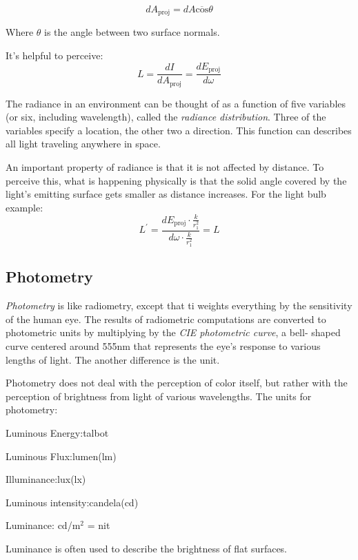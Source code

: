 \documentclass[10pt, a4paper]{article}
\begin{document}
        $$dA_{\text{proj}} = dA\overline{\text{cos}}\theta$$

        Where $\theta$ is the angle between two surface normals. 

        It's helpful to perceive: 
        $$L = \frac{dI}{dA_{\text{proj}}} = \frac{dE_{\text{proj}}}{d\omega}$$

        The radiance in an environment can be thought of as a function of five variables (or six, including wavelength), called the \emph{radiance distribution}. Three of the variables specify a location, the other two a direction. This function can describes all light traveling anywhere in space.

        An important property of radiance is that it is not affected by distance. To perceive this, what is happening physically is that the solid angle covered by the light's emitting surface gets smaller as distance increases. For the light bulb example: 
        $$L^{'} = \frac{dE_{\text{proj}}\cdot\frac{k}{r_1^2}}{d\omega\cdot\frac{k}{r_1^2}} = L$$

    \subsection{Photometry}
        \emph{Photometry} is like radiometry, except that ti weights everything by the sensitivity of the human eye. The results of radiometric computations are converted to photometric units by multiplying by the \emph{CIE photometric curve}, a bell- shaped curve centered around 555nm that represents the eye's response to various lengths of light. The another difference is the unit. 

        Photometry does not deal with the perception of color itself, but rather with the perception of brightness from light of various wavelengths. The units for photometry: 
        
        \begin{center}
            Luminous Energy:\quad talbot

            Luminous Flux:\quad lumen(lm) 

            Illuminance:\quad lux(lx) 

            Luminous intensity:\quad candela(cd) 

            Luminance: \quad cd/$\text{m}^2$ = nit
        \end{center}

        Luminance is often used to describe the brightness of flat surfaces. 
\end{document}
